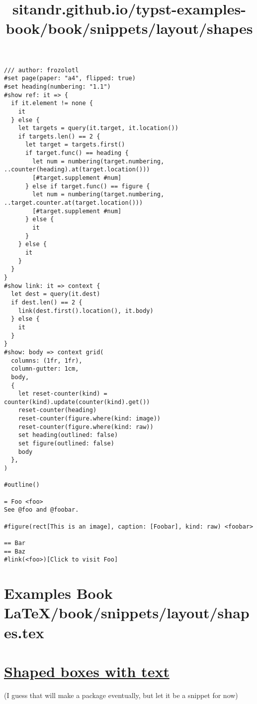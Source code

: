 \begin{verbatim}
/// author: frozolotl
#set page(paper: "a4", flipped: true)
#set heading(numbering: "1.1")
#show ref: it => {
  if it.element != none {
    it
  } else {
    let targets = query(it.target, it.location())
    if targets.len() == 2 {
      let target = targets.first()
      if target.func() == heading {
        let num = numbering(target.numbering, ..counter(heading).at(target.location()))
        [#target.supplement #num]
      } else if target.func() == figure {
        let num = numbering(target.numbering, ..target.counter.at(target.location()))
        [#target.supplement #num]
      } else {
        it
      }
    } else {
      it
    }
  }
}
#show link: it => context {
  let dest = query(it.dest)
  if dest.len() == 2 {
    link(dest.first().location(), it.body)
  } else {
    it
  }
}
#show: body => context grid(
  columns: (1fr, 1fr),
  column-gutter: 1cm,
  body,
  {
    let reset-counter(kind) = counter(kind).update(counter(kind).get())
    reset-counter(heading)
    reset-counter(figure.where(kind: image))
    reset-counter(figure.where(kind: raw))
    set heading(outlined: false)
    set figure(outlined: false)
    body
  },
)

#outline()

= Foo <foo>
See @foo and @foobar.

#figure(rect[This is an image], caption: [Foobar], kind: raw) <foobar>

== Bar
== Baz
#link(<foo>)[Click to visit Foo]
\end{verbatim}

\pandocbounded{}


\section{Examples Book LaTeX/book/snippets/layout/shapes.tex}
\title{sitandr.github.io/typst-examples-book/book/snippets/layout/shapes}

\section{\texorpdfstring{\hyperref[shaped-boxes-with-text]{Shaped boxes
with text}}{Shaped boxes with text}}\label{shaped-boxes-with-text}

(I guess that will make a package eventually, but let it be a snippet
for now)

